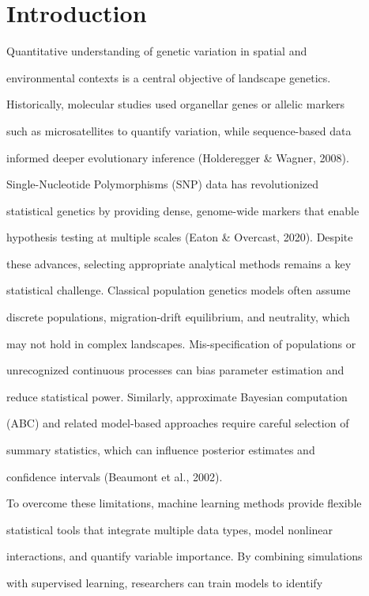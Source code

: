 \documentclass[10pt,twoside]{article}
\numberwithin{equation}{section}
\begin{document}
\section{Introduction}



Quantitative understanding of genetic variation in spatial and

environmental contexts is a central objective of landscape genetics.

Historically, molecular studies used organellar genes or allelic markers

such as microsatellites to quantify variation, while sequence-based data

informed deeper evolutionary inference (Holderegger \& Wagner, 2008).

Single-Nucleotide Polymorphisms (SNP) data has revolutionized

statistical genetics by providing dense, genome-wide markers that enable

hypothesis testing at multiple scales (Eaton \& Overcast, 2020). Despite

these advances, selecting appropriate analytical methods remains a key

statistical challenge. Classical population genetics models often assume

discrete populations, migration-drift equilibrium, and neutrality, which

may not hold in complex landscapes. Mis-specification of populations or

unrecognized continuous processes can bias parameter estimation and

reduce statistical power. Similarly, approximate Bayesian computation

(ABC) and related model-based approaches require careful selection of

summary statistics, which can influence posterior estimates and

confidence intervals (Beaumont et al., 2002).



To overcome these limitations, machine learning methods provide flexible

statistical tools that integrate multiple data types, model nonlinear

interactions, and quantify variable importance. By combining simulations

with supervised learning, researchers can train models to identify
\end{document}

